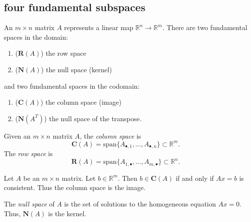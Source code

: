 \documentclass[12pt]{article}
\begin{document}
\subsection{four fundamental subspaces} %

An $m\times n$ matrix $A$ represents a linear map $\mathbb{R}^n\to\mathbb{R}^m$. There are two fundamental spaces in the domain:
\begin{enumerate}
	\item ($\mathbf{R}(A)$) the row space
	\item ($\mathbf{N}(A)$) the null space (kernel) 
\end{enumerate}
and two fundamental spaces in the codomain:
\begin{enumerate}
	\item ($\mathbf{C}(A)$) the column space (image)
	\item ($\mathbf{N}(A^T)$) the null space of the transpose.
\end{enumerate}

\begin{definition}
	Given an $m\times n$ matrix $A$, the \emph{column space} is 
	\begin{equation*}
		\mathbf{C}(A) = \text{span}\{A_{\bullet, 1}, \dots, A_{\bullet, n}\} \subset\mathbb{R}^m.
	\end{equation*}
	The \emph{row space} is 
	\begin{equation*}
		\mathbf{R}(A) = \text{span}\{A_{1,\bullet},\dots, A_{m,\bullet}\} \subset\mathbb{R}^n.
	\end{equation*}
\end{definition}

\begin{proposition}
	Let $A$ be an $m\times n$ matrix. Let $b\in\mathbb{R}^m$. Then $b\in\mathbf{C}(A)$ if and only if $Ax=b$ is consistent. Thus the column space is the image.
\end{proposition}

\begin{definition}
	The \emph{null space} of $A$ is the set of solutions to the homogeneous equation $Ax=0$. Thus, $\mathbf{N}(A)$ is the kernel.
\end{definition}
\end{document}
